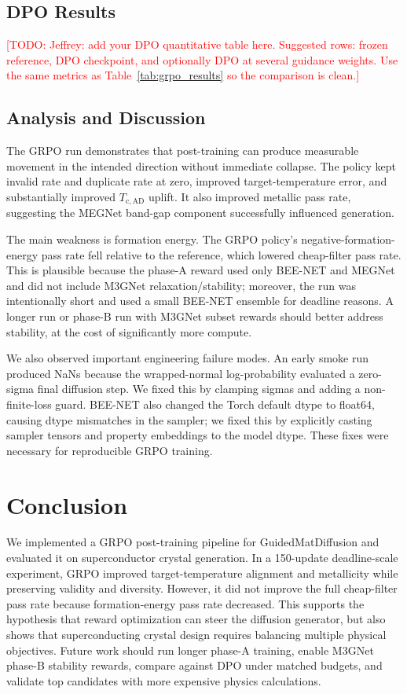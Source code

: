 \documentclass{article}
\newcommand{\Tcad}{T_{\mathrm{c,AD}}}
\newcommand{\todo}[1]{\textcolor{red}{[TODO: #1]}}
\begin{document}
\subsection{DPO Results}
\todo{Jeffrey: add your DPO quantitative table here. Suggested rows: frozen reference, DPO checkpoint, and optionally DPO at several guidance weights. Use the same metrics as Table~\ref{tab:grpo_results} so the comparison is clean.}

\subsection{Analysis and Discussion}
The GRPO run demonstrates that post-training can produce measurable movement in the intended direction without immediate collapse. The policy kept invalid rate and duplicate rate at zero, improved target-temperature error, and substantially improved $\Tcad$ uplift. It also improved metallic pass rate, suggesting the MEGNet band-gap component successfully influenced generation.

The main weakness is formation energy. The GRPO policy's negative-formation-energy pass rate fell relative to the reference, which lowered cheap-filter pass rate. This is plausible because the phase-A reward used only BEE-NET and MEGNet and did not include M3GNet relaxation/stability; moreover, the run was intentionally short and used a small BEE-NET ensemble for deadline reasons. A longer run or phase-B run with M3GNet subset rewards should better address stability, at the cost of significantly more compute.

We also observed important engineering failure modes. An early smoke run produced NaNs because the wrapped-normal log-probability evaluated a zero-sigma final diffusion step. We fixed this by clamping sigmas and adding a non-finite-loss guard. BEE-NET also changed the Torch default dtype to float64, causing dtype mismatches in the sampler; we fixed this by explicitly casting sampler tensors and property embeddings to the model dtype. These fixes were necessary for reproducible GRPO training.

\section{Conclusion}
We implemented a GRPO post-training pipeline for GuidedMatDiffusion and evaluated it on superconductor crystal generation. In a 150-update deadline-scale experiment, GRPO improved target-temperature alignment and metallicity while preserving validity and diversity. However, it did not improve the full cheap-filter pass rate because formation-energy pass rate decreased. This supports the hypothesis that reward optimization can steer the diffusion generator, but also shows that superconducting crystal design requires balancing multiple physical objectives. Future work should run longer phase-A training, enable M3GNet phase-B stability rewards, compare against DPO under matched budgets, and validate top candidates with more expensive physics calculations.
\end{document}
